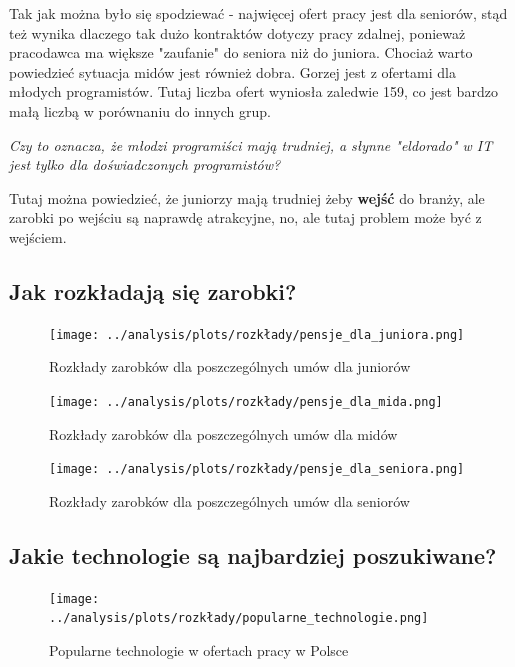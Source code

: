 \documentclass[a4paper]{article}
\begin{document}
\quad Tak jak można było się spodziewać - najwięcej ofert pracy jest dla seniorów,
stąd też wynika dlaczego tak dużo kontraktów dotyczy pracy zdalnej, ponieważ pracodawca ma większe "zaufanie" do seniora niż do juniora. Chociaż
warto powiedzieć sytuacja midów jest również dobra. Gorzej jest z ofertami dla młodych programistów.
Tutaj liczba ofert wyniosła zaledwie 159, co jest bardzo małą liczbą w porównaniu do innych grup.

\begin{center}
    \textit{Czy to oznacza, że młodzi programiści mają trudniej, a słynne "eldorado" w IT jest tylko dla doświadczonych programistów?}
\end{center}

\quad Tutaj można powiedzieć, że juniorzy mają trudniej żeby \textbf{wejść} do branży, ale zarobki po wejściu są naprawdę atrakcyjne,
no, ale tutaj problem może być z wejściem.


\subsection{Jak rozkładają się zarobki?}

\begin{figure}[H]
    \centering
    \texttt{[image: ../analysis/plots/rozkłady/pensje\_dla\_juniora.png]}
    \caption{Rozkłady zarobków dla poszczególnych umów dla juniorów}
\end{figure}

\begin{figure}[H]
    \centering
    \texttt{[image: ../analysis/plots/rozkłady/pensje\_dla\_mida.png]}
    \caption{Rozkłady zarobków dla poszczególnych umów dla midów}
\end{figure}

\begin{figure}[H]
    \centering
    \texttt{[image: ../analysis/plots/rozkłady/pensje\_dla\_seniora.png]}
    \caption{Rozkłady zarobków dla poszczególnych umów dla seniorów}
\end{figure}


\subsection{Jakie technologie są najbardziej poszukiwane?}

\begin{figure}[H]
    \centering
    \texttt{[image: ../analysis/plots/rozkłady/popularne\_technologie.png]}
    \caption{Popularne technologie w ofertach pracy w Polsce}
\end{figure}
\end{document}
